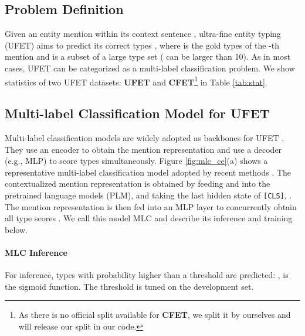 \documentclass[11pt]{article}
\begin{document}
\subsection{Problem Definition}
Given an entity mention  within its context sentence , ultra-fine entity typing (UFET) aims to predict its correct types , where  is the gold types of the -th mention and is a subset of a large type set  ( can be larger than 10). As  in most cases, UFET can be categorized as a multi-label classification problem. We show statistics of two UFET datasets: {\bf \textsc{UFET}} \cite{ufet} and {\bf \textsc{CFET}}\footnote{As there is no official split available for {\bf \textsc{CFET}}, we split it by ourselves and will release our split in our code.} \cite{cfet} in Table \ref{tab:stat}.

\begin{table}[t]
\caption{ denotes the average number of gold types per instance, ZH for Chinese.}
\label{tab:stat}
\end{table}

\subsection{Multi-label Classification Model for UFET}
\label{sec:mlc}
Multi-label classification models are widely adopted as backbones for UFET \cite{ufet, onoe-durrett-2019-learning, box4types}. They use an encoder to obtain the mention representation and use a decoder (e.g., MLP) to score types simultaneously. Figure \ref{fig:mlc_ce}(a) shows a representative multi-label classification model adopted by recent methods \cite{npcrf,mlmet}. The contextualized mention representation is obtained by feeding  and  into the pretrained language models (PLM), and taking the last hidden state of {\tt [CLS]}, . The mention representation is then fed into an MLP layer to concurrently obtain all type scores . We call this model MLC and describe its inference and training below. 
\paragraph{MLC Inference} For inference, types with probability higher than a threshold  are predicted: ,  is the sigmoid function. The threshold is tuned on the development set.
\end{document}
